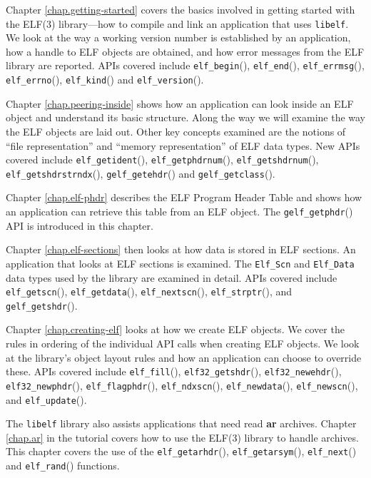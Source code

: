 \documentclass[a4paper]{report}
\newcommand{\function}[1]{\texttt{#1}()}
\newcommand{\library}[1]{\texttt{#1}}
\newcommand{\tool}[1]{\textbf{#1}}
\newcommand{\type}[1]{\texttt{#1}}
\begin{document}
Chapter \vref{chap.getting-started} covers the basics involved in
getting started with the ELF(3) library---how to compile and link an
application that uses \library{libelf}.  We look at the way a working
version number is established by an application, how a handle to ELF
objects are obtained, and how error messages from the ELF library are
reported.  APIs covered include \function{elf\_begin},
\function{elf\_end}, \function{elf\_errmsg}, \function{elf\_errno},
\function{elf\_kind} and \function{elf\_version}.

Chapter \vref{chap.peering-inside} shows how an application can look
inside an ELF object and understand its basic structure.  Along the
way we will examine the way the ELF objects are laid out.  Other key
concepts examined are the notions of ``file representation''
 and ``memory representation''
 of ELF data types.  New APIs covered
include \function{elf\_getident}, \function{elf\_getphdrnum},
\function{elf\_getshdrnum}, \function{elf\_getshdrstrndx},
\function{gelf\_getehdr} and \function{gelf\_getclass}.

Chapter \vref{chap.elf-phdr} describes the ELF Program Header Table and
shows how an application can retrieve this table from an ELF object.
The \function{gelf\_getphdr} API is introduced in this chapter.

Chapter \vref{chap.elf-sections} then looks at how data is stored in
ELF sections.  An application that looks at ELF sections is examined.
The \type{Elf\_Scn} and \type{Elf\_Data} data types used by the
library are examined in detail.  APIs covered include
\function{elf\_getscn}, \function{elf\_getdata},
\function{elf\_nextscn}, \function{elf\_strptr},
and \function{gelf\_getshdr}.

Chapter \vref{chap.creating-elf} looks at how we create ELF objects.
We cover the rules in ordering of the individual API calls when
creating ELF objects.  We look at the library's object layout rules
and how an application can choose to override these.  APIs covered
include \function{elf\_fill}, \function{elf32\_getshdr},
\function{elf32\_newehdr}, \function{elf32\_newphdr},
\function{elf\_flagphdr}, \function{elf\_ndxscn},
\function{elf\_newdata}, \function{elf\_newscn}, and
\function{elf\_update}.

The \library{libelf} library also assists applications that need read
\tool{ar} archives.  Chapter \vref{chap.ar} in the tutorial covers how
to use the ELF(3) library to handle archives.  This chapter covers the
use of the \function{elf\_getarhdr}, \function{elf\_getarsym},
\function{elf\_next} and \function{elf\_rand} functions.
\end{document}
